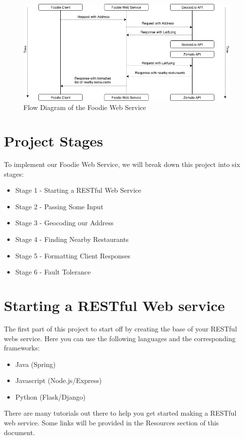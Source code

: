 \documentclass{article}
\begin{document}
\begin{figure}[h!]
    \includegraphics[width=\linewidth]{images/flowdiagram}
    \caption{Flow Diagram of the Foodie Web Service}
\end{figure}





\section*{Project Stages} %

To implement our Foodie Web Service, we will break down this project into six stages:
\begin{itemize}  
\item Stage 1 - Starting a RESTful Web Service
\item Stage 2 - Passing Some Input
\item Stage 3 - Geocoding our Address
\item Stage 4 - Finding Nearby Restaurants
\item Stage 5 - Formatting Client Responses
\item Stage 6 - Fault Tolerance
\end{itemize}



\section{Starting a RESTful Web service}
The first part of this project to start off by creating the base of your RESTful webs service. Here you can use the following languages and the corresponding frameworks:
\begin{itemize}
\item Java (Spring)
\item Javascript (Node.js/Express)
\item Python (Flask/Django)
\end{itemize}
There are many tutorials out there to help you get started making a RESTful web service. Some links will be provided in the Resources section of this document. 
\end{document}
